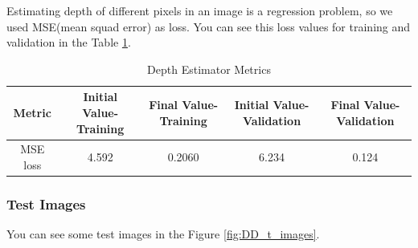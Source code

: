 \documentclass[a4paper, openany]{book}
\begin{document}
Estimating depth of different pixels in an image is a regression problem, so we used MSE(mean squad error) as loss. You can see this loss values for training and validation in the Table \ref{table:DD_Metrics}.

\begin{table}[htp]
\caption{Depth Estimator Metrics}
\begin{center}
\begin{tabular}{c | c | c | c | c}
Metric & Initial Value-Training & Final Value-Training &  Initial Value-Validation & Final Value-Validation\\
\hline
MSE loss &4.592 & 0.2060 & 6.234 & 0.124\\
\end{tabular}
\end{center}
\label{table:DD_Metrics}
\end{table}%




\newpage

\subsubsection{Test Images}
	\vspace{0.3cm}
	
You can see some test images in the Figure \ref{fig:DD_t_images}.
\end{document}

